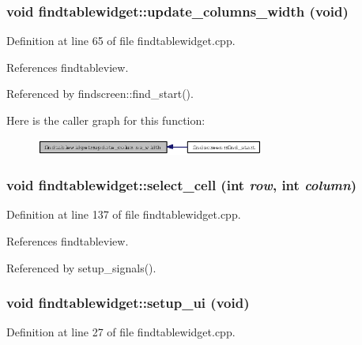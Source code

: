 \subsubsection{\setlength{\rightskip}{0pt plus 5cm}void findtablewidget::update\_\-columns\_\-width (void)}\label{classfindtablewidget_a62b6bee62382397fda46862da6f97b5}




Definition at line 65 of file findtablewidget.cpp.

References findtableview.

Referenced by findscreen::find\_\-start().

Here is the caller graph for this function:\begin{figure}[H]
\begin{center}
\leavevmode
\includegraphics[width=212pt]{classfindtablewidget_a62b6bee62382397fda46862da6f97b5_icgraph}
\end{center}
\end{figure}
\subsubsection{\setlength{\rightskip}{0pt plus 5cm}void findtablewidget::select\_\-cell (int {\em row}, int {\em column})\hspace{0.3cm}{\tt  [private, slot]}}\label{classfindtablewidget_6d103d08913c31b9aeeda5ea50e21d59}




Definition at line 137 of file findtablewidget.cpp.

References findtableview.

Referenced by setup\_\-signals().
\subsubsection{\setlength{\rightskip}{0pt plus 5cm}void findtablewidget::setup\_\-ui (void)\hspace{0.3cm}{\tt  [private]}}\label{classfindtablewidget_a9a60fc112c853da5d244d2ef826ae80}




Definition at line 27 of file findtablewidget.cpp.

